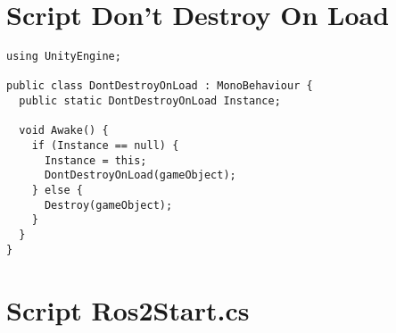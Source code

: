 \section{Script Don't Destroy On Load}
\label{appendix:dontdestroyonload}

\begin{lstlisting}[label=lst:dontdestroyonload, caption={Código de Don't Destroy On Load}]
using UnityEngine;

public class DontDestroyOnLoad : MonoBehaviour {
  public static DontDestroyOnLoad Instance;

  void Awake() {
    if (Instance == null) {
      Instance = this;
      DontDestroyOnLoad(gameObject);
    } else {
      Destroy(gameObject);
    }
  }
}
\end{lstlisting}


\section{Script Ros2Start.cs}
\label{appendix:ros2startscript}


